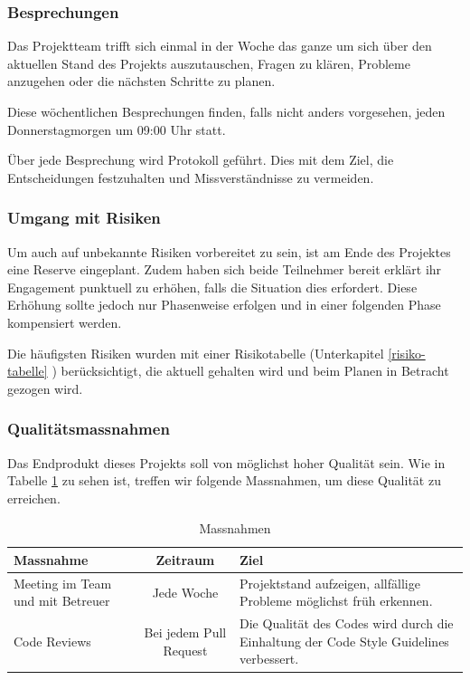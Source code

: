 \subsubsection*{Besprechungen}
Das Projektteam trifft sich einmal in der Woche das ganze um sich über den aktuellen Stand des Projekts auszutauschen, Fragen zu klären, Probleme anzugehen oder die nächsten Schritte zu planen. 

Diese wöchentlichen Besprechungen finden, falls nicht anders vorgesehen, jeden Donnerstagmorgen um 09:00 Uhr statt. 

Über jede Besprechung wird Protokoll geführt. Dies mit dem Ziel, die Entscheidungen festzuhalten und Missverständnisse zu vermeiden.


\subsubsection*{Umgang mit Risiken}
Um auch auf unbekannte Risiken vorbereitet zu sein, ist am Ende des Projektes eine Reserve eingeplant. Zudem haben sich beide Teilnehmer bereit erklärt ihr Engagement punktuell zu erhöhen, falls die Situation dies erfordert. Diese Erhöhung sollte jedoch nur Phasenweise erfolgen und in einer folgenden Phase kompensiert werden. 

Die häufigsten Risiken wurden mit einer Risikotabelle (Unterkapitel \ref{risiko-tabelle} ) be\-rück\-sichtigt, die aktuell gehalten wird und beim Planen in Betracht gezogen wird. 

\subsubsection*{Qualitätsmassnahmen}
Das Endprodukt dieses Projekts soll von möglichst hoher Qualität sein. Wie in Tabelle \ref{tab:Massnahmen} zu sehen ist, treffen wir folgende Massnahmen, um diese Qualität zu erreichen.

\renewcommand{\arraystretch}{2}
\begin{table}[h]
  \begin{tabular}{ | p{3cm} | c | p{5.5cm} | }
  	\hline
    \textbf{Massnahme}			& \textbf{Zeitraum}	 	& \textbf{Ziel} \\
    \hline
    Meeting im Team und mit Betreuer & Jede Woche & Projektstand aufzeigen, allfällige Probleme möglichst früh erkennen.\\
    \hline
    Code Reviews & Bei jedem Pull Request & Die Qualität des Codes wird durch die Einhaltung der Code Style Guidelines verbessert.\\
    \hline
  \end{tabular}
  \caption[Projektplan]{Massnahmen}
  \label{tab:Massnahmen}
\end{table}


